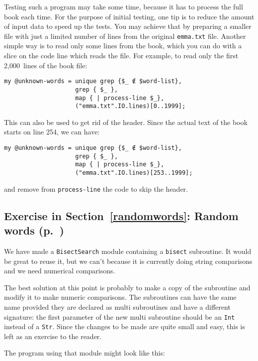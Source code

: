 Testing such a program may take some time, because it has to 
process the full book each time. For the purpose of initial 
testing, one tip is to reduce the amount of input 
data to speed up the tests. You may achieve that by 
preparing a smaller file with just a limited number 
of lines from the original {\tt emma.txt} file. 
Another simple way is to read only some lines from the 
book, which you can do with a slice on the code line which 
reads the file. For example, to read only the first 2,000~lines 
of the book file:

\begin{verbatim}
my @unknown-words = unique grep {$_ ∉ $word-list}, 
                    grep { $_ }, 
                    map { | process-line $_},  
                    ("emma.txt".IO.lines)[0..1999]; 
\end{verbatim}

This can also be used to get rid of the header. Since the 
actual text of the book starts on line 254, we can have:

\begin{verbatim}
my @unknown-words = unique grep {$_ ∉ $word-list}, 
                    grep { $_ }, 
                    map { | process-line $_},  
                    ("emma.txt".IO.lines)[253..1999]; 
\end{verbatim}
and remove from {\tt process-line} the code to skip the header.

\subsection{Exercise in Section~\ref{randomwords}: Random words (p.~\pageref{randhist})}
\label{sol_randhist}

We have made a {\tt BisectSearch} module containing a {\tt bisect} 
subroutine. It would be great to reuse it, but we can't because 
it is currently doing string comparisons and we need numerical 
comparisons.
 
The best solution at this point is probably to make a copy of 
the subroutine and modify it 
to make numeric comparisons. The subroutines can have the same 
name provided they are declared as multi subroutines and have 
a different signature: the first parameter of the new multi 
subroutine should be an {\tt Int} instead of a {\tt Str}. Since 
the changes to be made are quite small and easy, this is 
left as an exercise to the reader.

The program using that module might look like this:

